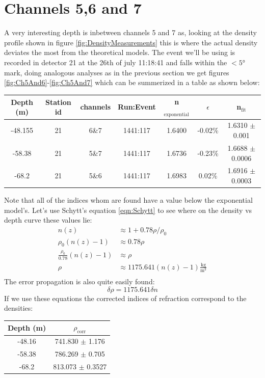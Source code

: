 \documentclass[11pt,a4paper,faculty=we,language=en,doctype=report]{cls/ugent-doc}
\begin{document}
\section{Channels 5,6 and 7}
A very interesting depth is inbetween channels 5 and 7 as, looking
at the density profile shown in figure \ref{fig:DensityMeasurements}
this is where the actual density deviates the most from the
theoretical models.  The event we'll be using is recorded in
detector 21 at the 26th of july 11:18:41 and falls within the $<5$°
mark, doing analogous analyses as in the previous section we get
figures \ref{fig:Ch5And6}-\ref{fig:Ch5And7} which can be summerized in a table as shown below:
	\label{fig:Ch5And7}
\begin{center}
\begin{tabular}{||c c c c c c c||}
 \hline
 Depth (m) & Station id & channels & Run:Event & n$_\text{exponential}$ & $\epsilon$ & n$_\text{fit}$\\ [0.5ex]
 \hline\hline
 -48.155 & 21 & 6\&7 & 1441:117 & 1.6400 & -0.02\% & 1.6310 $\pm$ 0.001 \\
 -58.38 & 21 & 5\&7 & 1441:117 & 1.6736 & -0.23\% & 1.6688 $\pm$ 0.0006 \\
 -68.2 & 21 & 5\&6 & 1441:117 & 1.6983 & 0.02\% & 1.6916 $\pm$ 0.0003 \\
 \hline
\end{tabular}
\end{center}
Note that all of the indices whom are found have a value below the
exponential model's.  Let's use Schytt's equation \ref{eqn:Schytt}
to see where on the density vs depth curve these values lie:
\begin{align}
	n(z) &\approx 1 + 0.78\rho/\rho_0\\
	\rho_0(n(z) - 1) &\approx 0.78\rho\\
	\frac{\rho_0}{0.78}(n(z) - 1) &\approx \rho\\
	\rho &\approx 1175.641(n(z) - 1)\frac{\text{kg}}{\text{m}^3}\\
\end{align}
The error propagation is also quite easily found:
\begin{equation}
	\delta \rho = 1175.641\delta n
\end{equation}
If we use these equations the corrected indices of refraction
correspond to the densities:
\begin{center}
\begin{tabular}{||c c||}
 \hline
 Depth (m) & $\rho_\text{corr}$\\ [0.5ex]
 \hline\hline
 -48.16 & 741.830 $\pm$ 1.176 \\
 -58.38 & 786.269 $\pm$ 0.705 \\
 -68.2 & 813.073 $\pm$ 0.3527 \\
 \hline
\end{tabular}
\end{center}
\end{document}
